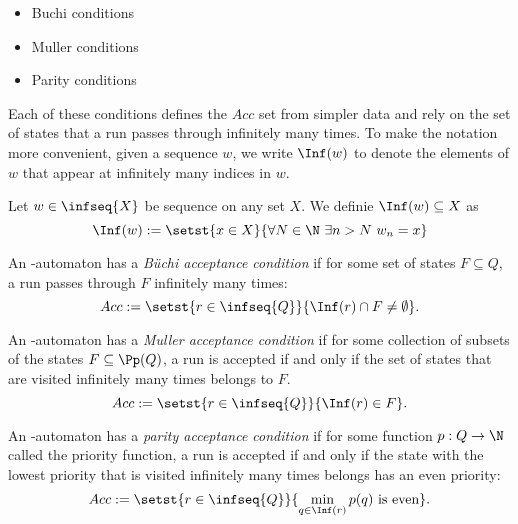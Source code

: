 \begin{multicols}{2}
\begin{itemize}
    \item Buchi conditions
    \item Muller conditions
    \item Parity conditions
\end{itemize}
\end{multicols}

Each of these conditions defines the $Acc$ set
from simpler data and rely on the set of states that
a run passes through infinitely many times.
To make the notation more convenient, given a sequence
$w$, we write $\Inf(w)$ to denote the
elements of $w$ that appear at infinitely many indices in $w$.

\begin{definition}
    Let $w \in \infseq{X}$ be sequence on any set $X$.
    We definie $\Inf(w) \subseteq X$ as
    \[
        \Inf(w) := \setst{x \in X}{
            \forall N \in \N~
            \exists n > N~
            w_n = x
        }
    \]
\end{definition}

\begin{definition}
    An \w-automaton has a \emph{Büchi acceptance condition}
    if for some set of states $F \subseteq Q$,
    a run passes through $F$ infinitely many times:
    \[
        Acc := \setst{
            r \in \infseq{Q}
        }{
            \Inf(r) \cap F \neq \emptyset
        }.
    \]

    An \w-automaton has a \emph{Muller acceptance condition}
    if for some collection of subsets of the states $F \subseteq \Pp(Q)$,
    a run is accepted if and only if the set of states that
    are visited infinitely many times belongs to $F$.
    \[
        Acc := \setst{
            r \in \infseq{Q}
        }{
            \Inf(r) \in F
        }.
    \]

    An \w-automaton has a \emph{parity acceptance condition}
    if for some function $p : Q \to \N$ called the priority function,
    a run is accepted if and only if the state with the lowest priority
    that is visited infinitely many times belongs has an even priority:
    \[
        Acc := \setst{
            r \in \infseq{Q}
        }{
            \min_{q \in \Inf(r)} p(q) \text{ is even}
        }.
    \]
\end{definition}

